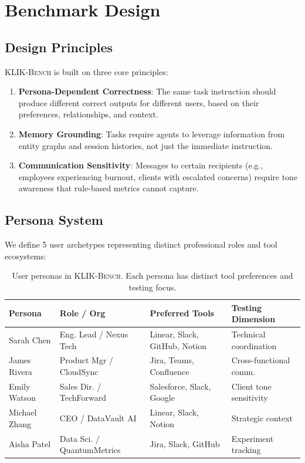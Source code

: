 \documentclass{article}
\newcommand{\klikbench}{\textsc{KLIK-Bench}}
\begin{document}
\section{Benchmark Design}
\label{sec:design}

\subsection{Design Principles}

\klikbench{} is built on three core principles:

\begin{enumerate}[leftmargin=*, itemsep=2pt]
    \item \textbf{Persona-Dependent Correctness}: The same task instruction should produce different correct outputs for different users, based on their preferences, relationships, and context.
    \item \textbf{Memory Grounding}: Tasks require agents to leverage information from entity graphs and session histories, not just the immediate instruction.
    \item \textbf{Communication Sensitivity}: Messages to certain recipients (e.g., employees experiencing burnout, clients with escalated concerns) require tone awareness that rule-based metrics cannot capture.
\end{enumerate}

\subsection{Persona System}

We define 5 user archetypes representing distinct professional roles and tool ecosystems:

\begin{table}[h]
\centering
\caption{User personas in \klikbench{}. Each persona has distinct tool preferences and testing focus.}
\label{tab:personas}
\small
\begin{tabular}{llll}
\toprule
\textbf{Persona} & \textbf{Role / Org} & \textbf{Preferred Tools} & \textbf{Testing Dimension} \\
\midrule
Sarah Chen & Eng. Lead / Nexus Tech & Linear, Slack, GitHub, Notion & Technical coordination \\
James Rivera & Product Mgr / CloudSync & Jira, Teams, Confluence & Cross-functional comm. \\
Emily Watson & Sales Dir. / TechForward & Salesforce, Slack, Google & Client tone sensitivity \\
Michael Zhang & CEO / DataVault AI & Linear, Slack, Notion & Strategic context \\
Aisha Patel & Data Sci. / QuantumMetrics & Jira, Slack, GitHub & Experiment tracking \\
\bottomrule
\end{tabular}
\end{table}
\end{document}
